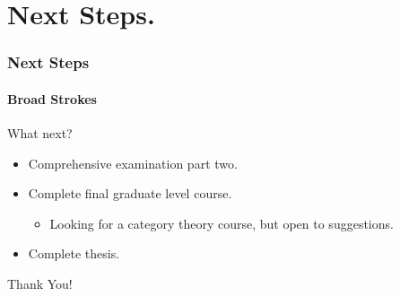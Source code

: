 \documentclass{beamer}
\begin{document}
\section[Next Steps]{Next Steps.}


\begin{frame}

\frametitle{Next Steps}
\framesubtitle{Broad Strokes}


\begin{Large}
What next?
\end{Large}

\begin{itemize}
\item Comprehensive examination part two.
\item Complete final graduate level course.
\begin{itemize}
\item Looking for a category theory course, but open to suggestions.
\end{itemize}
\item Complete thesis.
\end{itemize}
\end{frame}


\begin{frame}
\begin{center}
\Huge Thank You!
\end{center}
\end{frame}

\end{document}
